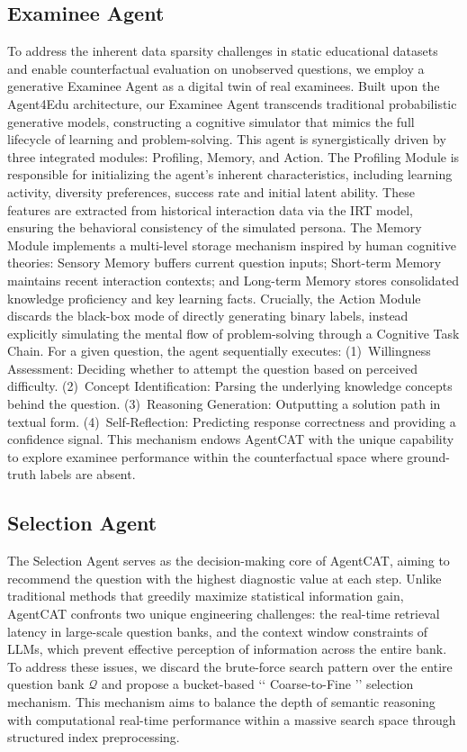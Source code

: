 \subsection{Examinee Agent}
To address the inherent data sparsity challenges in static educational datasets and enable counterfactual evaluation on unobserved questions, we employ a generative Examinee Agent as a digital twin of real examinees. Built upon the Agent4Edu\cite{gao2025agent4edu} architecture, our Examinee Agent transcends traditional probabilistic generative models, constructing a cognitive simulator that mimics the full lifecycle of learning and problem-solving. This agent is synergistically driven by three integrated modules: Profiling, Memory, and Action. The Profiling Module is responsible for initializing the agent's inherent characteristics, including learning activity, diversity preferences, success rate and initial latent ability. These features are extracted from historical interaction data via the IRT model, ensuring the behavioral consistency of the simulated persona. The Memory Module implements a multi-level storage mechanism inspired by human cognitive theories: Sensory Memory buffers current question inputs; Short-term Memory maintains recent interaction contexts; and Long-term Memory stores consolidated knowledge proficiency and key learning facts. Crucially, the Action Module discards the black-box mode of directly generating binary labels, instead explicitly simulating the mental flow of problem-solving through a Cognitive Task Chain. For a given question, the agent sequentially executes: (1)~Willingness Assessment: Deciding whether to attempt the question based on perceived difficulty. (2)~Concept Identification: Parsing the underlying knowledge concepts behind the question. (3)~Reasoning Generation: Outputting a solution path in textual form. (4)~Self-Reflection: Predicting response correctness and providing a confidence signal. This mechanism endows AgentCAT with the unique capability to explore examinee performance within the counterfactual space where ground-truth labels are absent.

\subsection{Selection Agent}
The Selection Agent serves as the decision-making core of AgentCAT, aiming to recommend the question with the highest diagnostic value at each step. Unlike traditional methods that greedily maximize statistical information gain, AgentCAT confronts two unique engineering challenges: the real-time retrieval latency in large-scale question banks, and the context window constraints of LLMs, which prevent effective perception of information across the entire bank. To address these issues, we discard the brute-force search pattern over the entire question bank $\mathcal{Q}$ and propose a bucket-based ‘‘ Coarse-to-Fine ’’ selection mechanism\cite{jiang2023active}. This mechanism aims to balance the depth of semantic reasoning with computational real-time performance within a massive search space through structured index preprocessing.
